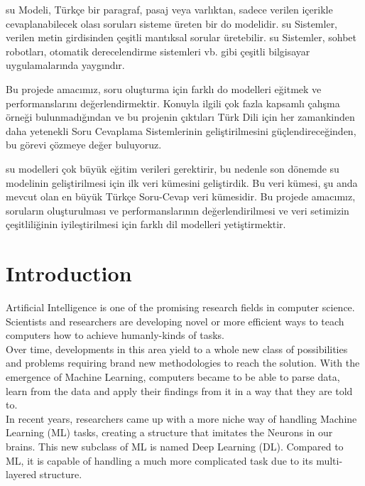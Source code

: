 \documentclass{mefsdp}
\begin{document}
		
	\begin{abstractTR}
	\gls{su} Modeli, Türkçe bir paragraf, pasaj veya varlıktan, sadece verilen içerikle cevaplanabilecek olası soruları sisteme üreten bir \gls{do} modelidir. \gls{su} Sistemler, verilen metin girdisinden çeşitli mantıksal sorular üretebilir. \gls{su} Sistemler, sohbet robotları, otomatik derecelendirme sistemleri vb. gibi çeşitli bilgisayar uygulamalarında yaygındır. \newline \par
	
	Bu projede amacımız, soru oluşturma için farklı \gls{do} modelleri eğitmek ve performanslarını değerlendirmektir. Konuyla ilgili çok fazla kapsamlı çalışma örneği bulunmadığından ve bu projenin çıktıları Türk Dili için her zamankinden daha yetenekli Soru Cevaplama Sistemlerinin geliştirilmesini güçlendireceğinden, bu görevi çözmeye değer buluyoruz.
	\newline \par 
	\gls{su} modelleri çok büyük eğitim verileri gerektirir, bu nedenle son dönemde \gls{su} modelinin geliştirilmesi için ilk veri kümesini geliştirdik. Bu veri kümesi, şu anda mevcut olan en büyük Türkçe Soru-Cevap veri kümesidir. Bu projede amacımız, soruların oluşturulması ve performanslarının değerlendirilmesi ve veri setimizin çeşitliliğinin iyileştirilmesi için farklı dil modelleri yetiştirmektir.
			
	\end{abstractTR}
	
	\makelists
	
	\section{Introduction}
	Artificial Intelligence is one of the promising research fields in computer science. Scientists and researchers are developing novel or more efficient ways to teach computers how to achieve humanly-kinds of tasks.\\
	
	Over time, developments in this area yield to a whole new class of possibilities and problems requiring brand new methodologies to reach the solution. With the emergence of Machine Learning, computers became to be able to parse data, learn from the data and apply their findings from it in a way that they are told to.\\
	
	In recent years, researchers came up with a more niche way of handling Machine Learning (ML) tasks, creating a structure that imitates the Neurons in our brains. This new subclass of ML is named Deep Learning (DL). Compared to ML, it is capable of handling a much more complicated task due to its multi-layered structure.\\
	
\end{document}
